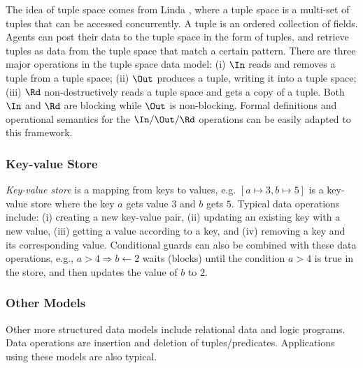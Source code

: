 The idea of tuple space comes from Linda \cite{Gelernter85:Linda}, where
a tuple space is a multi-set of tuples that can be accessed concurrently.
A tuple is an ordered collection of fields. 
Agents can post their data to the tuple space in the form of tuples, and 
retrieve tuples as data from the tuple space that match a certain pattern.
There are three major operations in the tuple space data model:
(i) $\In$ reads and removes a tuple from a tuple space;
(ii) $\Out$ produces a tuple, writing it into a tuple space;
(iii) $\Rd$ non-destructively reads a tuple space and gets a copy of a tuple. 
Both $\In$ and $\Rd$ are blocking while $\Out$ is non-blocking.
Formal definitions and operational semantics for
the $\In/\Out/\Rd$ operations \cite{Ciancarini95}
can be easily adapted to this framework.

\subsubsection*{Key-value Store}

{\em Key-value store} is a mapping from keys 
to values, e.g.
$[a\mapsto 3, b\mapsto 5]$ is a key-value store
where the key $a$ gets value $3$ and $b$ gets $5$.
Typical data operations include: (i) creating a new key-value pair,
(ii) updating an existing key with a new value,
(iii) getting a value according to a key, and
(iv) removing a key and its corresponding value.
Conditional guards can also be combined with these data operations,
e.g., $a>4\Rightarrow b\gets 2$ waits (blocks) until
the condition $a>4$ is true in the store,
and then updates the value of $b$ to $2$.

\subsubsection*{Other Models}

Other more structured data models include relational data and logic programs.
Data operations are insertion and deletion of tuples/predicates. Applications
using these models are also typical.
